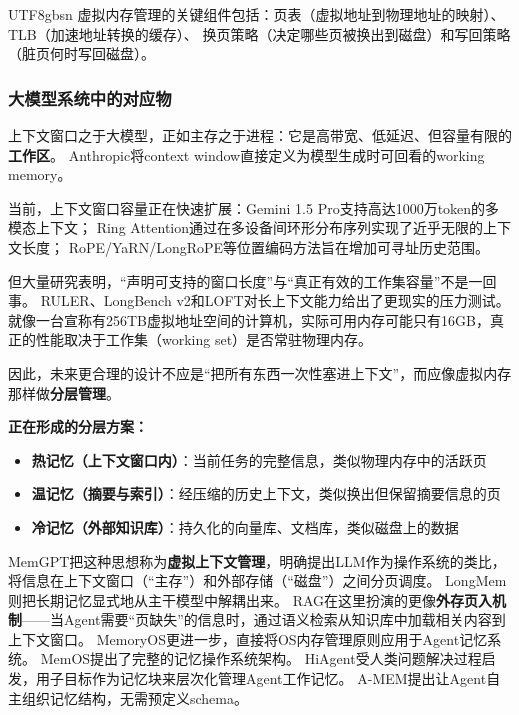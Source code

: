 \documentclass[11pt,a4paper]{article}
\begin{document}
\begin{CJK*}{UTF8}{gbsn}
虚拟内存管理的关键组件包括：页表（虚拟地址到物理地址的映射）、TLB（加速地址转换的缓存）、
换页策略（决定哪些页被换出到磁盘）和写回策略（脏页何时写回磁盘）\cite{ostep_2023}。

\subsubsection{大模型系统中的对应物}

上下文窗口之于大模型，正如主存之于进程：它是高带宽、低延迟、但容量有限的\textbf{工作区}。
Anthropic将context window直接定义为模型生成时可回看的working memory。

当前，上下文窗口容量正在快速扩展：Gemini 1.5 Pro支持高达1000万token的多模态上下文\cite{gemini2024}；
Ring Attention通过在多设备间环形分布序列实现了近乎无限的上下文长度\cite{liu2024ringattention}；
RoPE/YaRN/LongRoPE等位置编码方法旨在增加可寻址历史范围\cite{su2021roformer,yarn2024,longrope2024}。

但大量研究表明，``声明可支持的窗口长度''与``真正有效的工作集容量''不是一回事。
RULER、LongBench v2和LOFT对长上下文能力给出了更现实的压力测试\cite{ruler2024,longbenchv2_2024,loft2024}。
就像一台宣称有256TB虚拟地址空间的计算机，实际可用内存可能只有16GB，真正的性能取决于工作集（working set）是否常驻物理内存。

因此，未来更合理的设计不应是``把所有东西一次性塞进上下文''，而应像虚拟内存那样做\textbf{分层管理}。

\textbf{正在形成的分层方案：}
\begin{itemize}[nosep]
\item \textbf{热记忆（上下文窗口内）}：当前任务的完整信息，类似物理内存中的活跃页
\item \textbf{温记忆（摘要与索引）}：经压缩的历史上下文，类似换出但保留摘要信息的页
\item \textbf{冷记忆（外部知识库）}：持久化的向量库、文档库，类似磁盘上的数据
\end{itemize}

MemGPT把这种思想称为\textbf{虚拟上下文管理}，明确提出LLM作为操作系统的类比，将信息在上下文窗口（``主存''）和外部存储（``磁盘''）之间分页调度\cite{memgpt2023}。
LongMem则把长期记忆显式地从主干模型中解耦出来\cite{longmem2023}。
RAG在这里扮演的更像\textbf{外存页入机制}——当Agent需要``页缺失''的信息时，通过语义检索从知识库中加载相关内容到上下文窗口\cite{lewis2020rag}。
MemoryOS更进一步，直接将OS内存管理原则应用于Agent记忆系统\cite{memoryos2025}。
MemOS提出了完整的记忆操作系统架构\cite{memos2025}。
HiAgent受人类问题解决过程启发，用子目标作为记忆块来层次化管理Agent工作记忆\cite{hiagent2024}。
A-MEM提出让Agent自主组织记忆结构，无需预定义schema\cite{amem2025}。


\end{CJK*}
\end{document}
